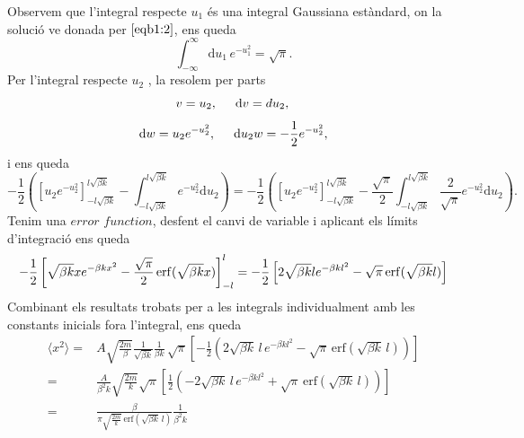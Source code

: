 \documentclass[a4paper, 10pt]{article}
\begin{document}
\begin{enumerate}
	Observem que l'integral respecte $u_1$ és una integral Gaussiana estàndard, on la solució ve donada per $\eqref{eqb1:2}$, ens queda 
	\begin{equation}
		\int_{-\infty}^{\infty} \mathrm{d}u_1 \,e^{-u_1^2} = \sqrt{\pi}.
	\end{equation}
	Per l'integral respecte $u_2$ , la resolem per parts
	\begin{equation}
		v = u_2, \hspace{0.5cm} \mathrm{d}v = du_2, \\
	\end{equation}
	\begin{equation}
		\mathrm{d}w = u_2 e^{-u_2^2}, \hspace{0.5cm}  \mathrm{d}u_2  w = -\frac{1}{2} e^{-u_2^2},
	\end{equation} 
	i ens queda 
	\begin{equation}
		-\frac{1}{2}\left(\left[u_2 e^{-u_2^2}\right]_{-l\sqrt{\beta k}}^{l\sqrt{\beta k}} - \int_{-l\sqrt{\beta k}}^{l\sqrt{\beta k}} e^{-u_2^2} \mathrm{d}u_2 \right) = -\frac{1}{2}\left(\left[u_2 e^{-u_2^2}\right]_{-l\sqrt{\beta k}}^{l\sqrt{\beta k}} - \frac{\sqrt{\pi}}{2}\int_{-l\sqrt{\beta k}}^{l\sqrt{\beta k}} \frac{2}{\sqrt{\pi}} e^{-u_2^2} \mathrm{d}u_2 \right).
	\end{equation}
	Tenim una $\textit{error function}$, desfent el canvi de variable i aplicant els límits d'integració ens queda 
	\begin{equation}
		-\frac{1}{2}\left[\sqrt{\beta k} x e^{-\beta k x^2} - \frac{\sqrt{\pi}}{2}\erf(\sqrt{\beta k} x)\right]_{-l}^{l} = -\frac{1}{2}\left[2\sqrt{\beta k} l e^{-\beta k l^2} - \sqrt{\pi}\erf(\sqrt{\beta k} l)\right]
	\end{equation}
	Combinant els resultats trobats per a les integrals individualment amb les constants inicials fora l'integral, ens queda 
\begin{align*}
	\langle x^2 \rangle
	= {} & A \sqrt{\frac{2m}{\beta}}
	\frac{1}{\sqrt{\beta k}}
	\frac{1}{\beta k}\,\sqrt{\pi}
	\left[
	-\frac{1}{2}\left(
	2\sqrt{\beta k}\,l\, e^{-\beta k l^2}
	- \sqrt{\pi}\,\mathrm{erf}(\sqrt{\beta k}\,l)
	\right)
	\right] \\[6pt]
	= {} &
	\frac{A}{\beta^2 k}
	\sqrt{\frac{2m}{k}}\sqrt{\pi}
	\left[
	\frac{1}{2}\left(
	-2\sqrt{\beta k}\,l\, e^{-\beta k l^2}
	+ \sqrt{\pi}\,\mathrm{erf}(\sqrt{\beta k}\,l)
	\right)
	\right] \\[6pt]
	= {} &
	\frac{\beta}{\pi\sqrt{\frac{2m}{k}}\,\mathrm{erf}(\sqrt{\beta k}\,l)}
	\frac{1}{\beta^2 k}

\end{align*}
\end{enumerate}
\end{document}

